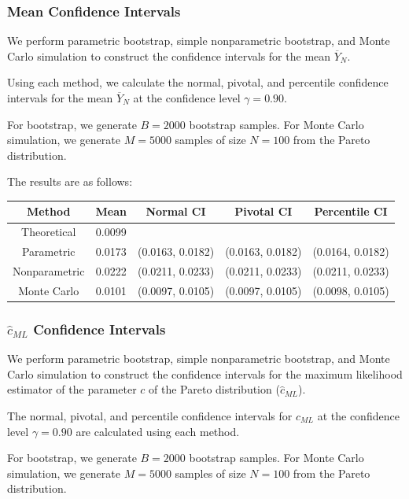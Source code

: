 \documentclass{article}
\begin{document}
\subsubsection{Mean Confidence Intervals}

We perform parametric bootstrap, simple nonparametric bootstrap, and Monte Carlo simulation to construct the confidence intervals for the mean \(\overline{Y}_N\).

Using each method, we calculate the normal, pivotal, and percentile confidence intervals for the mean \(\overline{Y}_N\) at the confidence level \(\gamma = 0.90\).

For bootstrap, we generate \(B = 2000\) bootstrap samples. For Monte Carlo simulation, we generate \(M = 5000\) samples of size \(N = 100\) from the Pareto distribution.

The results are as follows:

\begin{table}[h]
\centering
\begin{tabular}{|c|c|c|c|c|}
\hline
\textbf{Method} & \textbf{Mean} & \textbf{Normal CI} & \textbf{Pivotal CI} & \textbf{Percentile CI} \\ \hline
Theoretical & 0.0099 & & & \\ \hline
Parametric & 0.0173 & (0.0163, 0.0182) & (0.0163, 0.0182) & (0.0164, 0.0182) \\ \hline
Nonparametric & 0.0222 & (0.0211, 0.0233) & (0.0211, 0.0233) & (0.0211, 0.0233) \\ \hline
Monte Carlo & 0.0101 & (0.0097, 0.0105) & (0.0097, 0.0105) & (0.0098, 0.0105) \\ \hline
\end{tabular}
\end{table}

\subsubsection{\(\hat{c}_{ML}\) Confidence Intervals}

We perform parametric bootstrap, simple nonparametric bootstrap, and Monte Carlo simulation to construct the confidence intervals for the maximum likelihood estimator of the parameter \(c\) of the Pareto distribution (\(\hat{c}_{ML}\)).

The normal, pivotal, and percentile confidence intervals for \(\hat{c}_{ML}\) at the confidence level \(\gamma = 0.90\) are calculated using each method.

For bootstrap, we generate \(B = 2000\) bootstrap samples. For Monte Carlo simulation, we generate \(M = 5000\) samples of size \(N = 100\) from the Pareto distribution.
\end{document}

